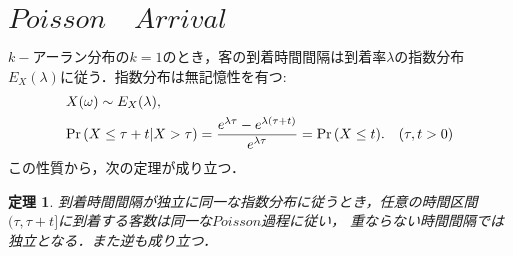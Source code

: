 \documentclass[a4j,papersize,disablejfam,slide,14pt]{jsarticle}
\newtheorem{Prop}{定理}
\def\exp#1{\mbox{$ e^{#1} $}} %
\def\prob#1{\mbox{${\rm Pr} \left( #1 \right)$}} %
\def\cprob#1#2{\mbox{${\rm Pr} \left( #1 | #2 \right)$}} %
\begin{document}
\section{$Poisson\quad Arrival$}
	$k-$アーラン分布の$k = 1$のとき，客の到着時間間隔は到着率$\lambda$の指数分布$E_X(\lambda)$に従う．指数分布は無記憶性を有つ:
    \begin{eqnarray}
    	&X(\omega) \sim E_X(\lambda),\\
    	&\cprob{X \leq \tau+t}{X > \tau} = \frac{\exp{\lambda \tau} - \exp{\lambda (\tau+t)}}{\exp{\lambda \tau}} = \prob{X \leq t}. \quad (\tau,t > 0)
    \end{eqnarray}
    この性質から，次の定理が成り立つ．
    \begin{screen}
    	\begin{Prop}
    		到着時間間隔が独立に同一な指数分布に従うとき，任意の時間区間$(\tau, \tau + t]$に到着する客数は同一な$Poisson$過程に従い，
    		重ならない時間間隔では独立となる．また逆も成り立つ．
        \end{Prop}
    \end{screen}
\end{document}
